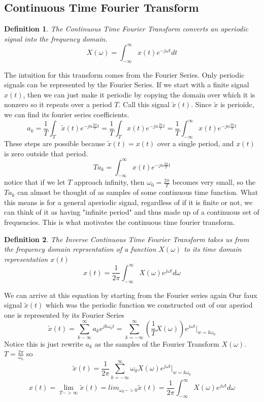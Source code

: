 \documentclass{article}
\newtheorem{definition}{Definition}
\begin{document}
\subsection{Continuous Time Fourier Transform}
\begin{definition}
    The Continuous Time Fourier Transform converts an aperiodic signal into the frequency domain.
    $$X(\omega) = \int_{-\infty}^{\infty}{x(t)e^{-j\omega t}dt}$$
\end{definition}
The intuition for this transform comes from the Fourier Series. Only periodic signals can be represented by the Fourier Series.
If we start with a finite signal $x(t)$, then we can just make it periodic by copying the domain over which it is nonzero so 
it repeats over a period $T$. Call this signal $\tilde{x}(t)$. Since $\tilde{x}$ is perioidc,
we can find its fourier series coefficients.
\[
    a_k = \frac{1}{T}\int_{T}{\tilde{x}(t)e^{-jn\frac{2\pi}{T}t}} = 
    \frac{1}{T}\int_{T}{x(t)e^{-jn\frac{2\pi}{T}t}} = \frac{1}{T}\int_{-\infty}^{\infty}{x(t)e^{-jn\frac{2\pi}{T}t}}
\]
These steps are possible because $\tilde{x}(t) = x(t)$ over a single period, and $x(t)$ is zero outside that period.
$$Ta_k = \int_{-\infty}^{\infty}{x(t)e^{-jn\frac{2\pi}{T}t}}$$
notice that if we let $T$ approach infinity, then $\omega_0 = \frac{2\pi}{T}$ becomes very small, so the $Ta_k$
can almost be thought of as samples of some continuous time function. What this means is for a general aperiodic signal,
regardless of if it is finite or not, we can think of it as having "infinite period" and thus made up of a continuous set of frequencies.
This is what motivates the continuous time fourier transform.
\begin{definition}
    The Inverse Continuous Time Fourier Transform takes us from the frequency domain
    reprsentation of a function $X(\omega)$ to its time domain representation $x(t)$
    $$x(t) = \frac{1}{2\pi}\int_{-\infty}^{\infty}{X(\omega)e^{j\omega t}d\omega}$$
\end{definition}
We can arrive at this equation by starting from the Fourier series again
Our faux signal $\tilde{x}(t)$ which was the periodic function we constructed out of our aperiod one
is represented by its Fourier Series
$$\tilde{x}(t) = \sum_{k-\infty}^{\infty}{a_ke^{jk\omega_0t}} = \sum_{k=-\infty}^{\infty}{(\frac{1}{T}X(\omega))e^{j\omega t}}|_{w=k\omega_0}$$
Notice this is just rewrite $a_k$ as the samples of the Fourier Transform $X(\omega)$. $T = \frac{2\pi}{\omega_0}$ so
$$\tilde{x}(t) = \frac{1}{2\pi} \sum_{k=-\infty}^{\infty}{\omega_0X(\omega)e^{j\omega t}}|_{w=k\omega_0}$$
$$x(t) = \lim_{T->\infty}{\tilde{x}(t)} = lim_{\omega_0->0}{\tilde{x}(t)} = \frac{1}{2\pi}\int_{-\infty}^{\infty}{X(\omega)e^{j\omega t}d\omega}$$
\end{document}
